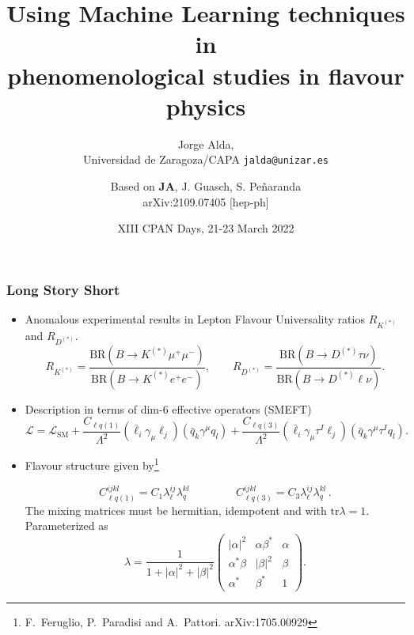 \documentclass[mathserif, 10pt]{beamer}
\title[Using ML techniques in phenomenological studies in flavour physics]{Using Machine Learning techniques in\\ phenomenological studies in flavour physics}
\subtitle{Jorge Alda,\\ Universidad de Zaragoza/CAPA \hspace{4em} \texttt{jalda@unizar.es} }
\author[Jorge Alda]{Based on \textbf{JA}, J. Guasch, S. Peñaranda \\
arXiv:2109.07405 [hep-ph]}
\date[XII CPAN Days]{XIII CPAN Days, 21-23 March 2022}
\begin{document}
\begin{frame}
\titlepage
\end{frame}

\begin{frame}
\frametitle{Long Story Short}
\begin{itemize}
\item Anomalous experimental results in Lepton Flavour Universality ratios $R_{K^{(*)}}$ and $R_{D^{(*)}}$.
$$R_{K^{(*)}} = \frac{\mathrm{BR}(B\to K^{(*)}\mu^+ \mu^-)}{\mathrm{BR}(B\to K^{(*)}e^+ e^-)},\qquad R_{D^{(*)}} = \frac{\mathrm{BR}(B\to D^{(*)}\tau \nu)}{\mathrm{BR}(B\to D^{(*)}\ell \nu)}.$$
\item Description in terms of dim-6 effective operators (SMEFT)
$$\mathcal{L} = \mathcal{L}_\mathrm{SM} + \frac{C_{\ell q (1)}}{\Lambda^2}  (\bar{\ell}_i \gamma_\mu \ell_j)(\bar{q}_k \gamma^\mu  q_l)+\frac{C_{\ell q (3)}}{\Lambda^2}(\bar{\ell}_i \gamma_\mu \tau^I \ell_j)(\bar{q}_k \gamma^\mu \tau^I q_l).$$

\item Flavour structure given by\footnote[1]{F.~Feruglio, P.~Paradisi and A.~Pattori. arXiv:1705.00929}

$$C_{\ell q(1)}^{ijkl} = C_1 \lambda_\ell^{ij}\lambda_q^{kl}\,\qquad\qquad C_{\ell q(3)}^{ijkl} = C_3 \lambda_\ell^{ij}\lambda_q^{kl}\,. $$
The mixing matrices must be hermitian, idempotent and with $\mathrm{tr}\lambda =1$. Parameterized as
$$ \lambda = \frac{1}{1+|\alpha|^2+|\beta|^2}\begin{pmatrix}
|\alpha|^2 & \alpha \beta^* & \alpha \\ \alpha^* \beta & |\beta|^2 & \beta \\ \alpha^* & \beta^* & 1
\end{pmatrix}. $$
\end{itemize}
\end{frame}
\end{document}
